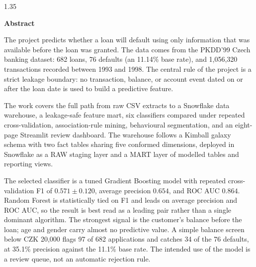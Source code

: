 \documentclass[12pt, a4paper]{report}
\begin{document}
\newpage
\begin{spacing}{1.35}
\tableofcontents
\end{spacing}
\listoffigures
\listoftables

\clearpage
{}
{}
\begin{center}
    {\huge \textbf{Abstract}}\\[1cm]
\end{center}

The project predicts whether a loan will default using only information that was available before the loan was granted. The data comes from the PKDD'99 Czech banking dataset: 682 loans, 76 defaults (an 11.14\% base rate), and 1,056,320 transactions recorded between 1993 and 1998. The central rule of the project is a strict leakage boundary: no transaction, balance, or account event dated on or after the loan date is used to build a predictive feature.

The work covers the full path from raw CSV extracts to a Snowflake data warehouse, a leakage-safe feature mart, six classifiers compared under repeated cross-validation, association-rule mining, behavioural segmentation, and an eight-page Streamlit review dashboard. The warehouse follows a Kimball galaxy schema with two fact tables sharing five conformed dimensions, deployed in Snowflake as a RAW staging layer and a MART layer of modelled tables and reporting views.

The selected classifier is a tuned Gradient Boosting model with repeated cross-validation F1 of $0.571 \pm 0.120$, average precision $0.654$, and ROC AUC $0.864$. Random Forest is statistically tied on F1 and leads on average precision and ROC AUC, so the result is best read as a leading pair rather than a single dominant algorithm. The strongest signal is the customer's balance before the loan; age and gender carry almost no predictive value. A simple balance screen below CZK 20,000 flags 97 of 682 applications and catches 34 of the 76 defaults, at 35.1\% precision against the 11.1\% base rate. The intended use of the model is a review queue, not an automatic rejection rule.

\clearpage
{}












\end{document}
